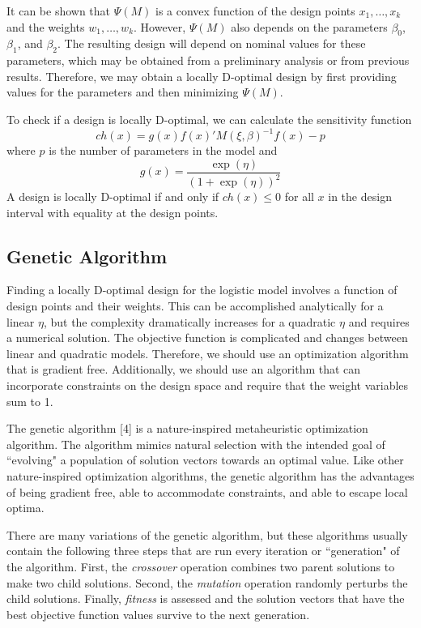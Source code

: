 \documentclass[11pt,a4paper]{article}
\begin{document}
It can be shown that $\Psi(M)$ is a convex function of the design points $x_1, \dots, x_k$ and  the weights $w_1, \dots, w_k$. However, $\Psi(M)$ also depends on the parameters $\beta_0$, $\beta_1$, and $\beta_2$. The resulting design will depend on nominal values for these parameters, which may be obtained from a preliminary analysis or from previous results. Therefore, we may obtain a locally D-optimal design by first providing values for the parameters and then minimizing $\Psi(M)$.

To check if a design is locally D-optimal, we can calculate the sensitivity function
$$
ch(x) = g(x) f(x)'M(\xi, \beta)^{-1} f(x) - p
$$
where $p$ is the number of parameters in the model and
$$
g(x) = \frac{\exp(\eta)}{(1+\exp(\eta))^2}
$$
A design is locally D-optimal if and only if $ch(x) \leq 0 $ for all $x$ in the design interval with equality at the design points.


\subsection{Genetic Algorithm}
Finding a locally D-optimal design for the logistic model involves a function of design points and their weights. This can be accomplished analytically for a linear $\eta$, but the complexity dramatically increases for a quadratic $\eta$ and requires a numerical solution. The objective function is complicated and changes between linear and quadratic models. Therefore, we should use an optimization algorithm that is gradient free. Additionally, we should use an algorithm that can incorporate constraints on the design space and require that the weight variables sum to 1.

The genetic algorithm [4] is a nature-inspired metaheuristic optimization algorithm. The algorithm mimics natural selection with the intended goal of ``evolving" a population of solution vectors towards an optimal value. Like other nature-inspired optimization algorithms, the genetic algorithm has the advantages of being gradient free, able to accommodate constraints, and able to escape local optima. 

There are many variations of the genetic algorithm, but these algorithms usually contain the following three steps that are run every iteration or ``generation" of the algorithm. First, the \textit{crossover} operation combines two parent solutions to make two child solutions. Second, the \textit{mutation} operation randomly perturbs the child solutions. Finally, \textit{fitness} is assessed and the solution vectors that have the best objective function values survive to the next generation.
\end{document}
